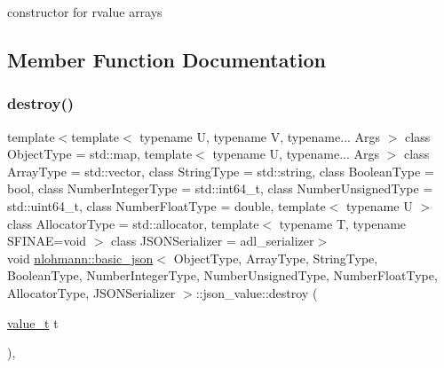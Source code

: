 constructor for rvalue arrays 



\subsection{Member Function Documentation}
\mbox{\label{unionnlohmann_1_1basic__json_1_1json__value_ad54d0055a5cbb83b7ebe9c0950afd398}} 
\subsubsection{\texorpdfstring{destroy()}{destroy()}}
{\footnotesize\ttfamily template$<$template$<$ typename U, typename V, typename... Args $>$ class Object\+Type = std\+::map, template$<$ typename U, typename... Args $>$ class Array\+Type = std\+::vector, class String\+Type  = std\+::string, class Boolean\+Type  = bool, class Number\+Integer\+Type  = std\+::int64\+\_\+t, class Number\+Unsigned\+Type  = std\+::uint64\+\_\+t, class Number\+Float\+Type  = double, template$<$ typename U $>$ class Allocator\+Type = std\+::allocator, template$<$ typename T, typename S\+F\+I\+N\+A\+E=void $>$ class J\+S\+O\+N\+Serializer = adl\+\_\+serializer$>$ \\
void \mbox{\hyperlink{classnlohmann_1_1basic__json}{nlohmann\+::basic\+\_\+json}}$<$ Object\+Type, Array\+Type, String\+Type, Boolean\+Type, Number\+Integer\+Type, Number\+Unsigned\+Type, Number\+Float\+Type, Allocator\+Type, J\+S\+O\+N\+Serializer $>$\+::json\+\_\+value\+::destroy (\begin{DoxyParamCaption}\item[{\mbox{\hyperlink{namespacenlohmann_1_1detail_a1ed8fc6239da25abcaf681d30ace4985}{value\+\_\+t}}}]{t }\end{DoxyParamCaption})\hspace{0.3cm}{\ttfamily [inline]}, {\ttfamily [noexcept]}}



